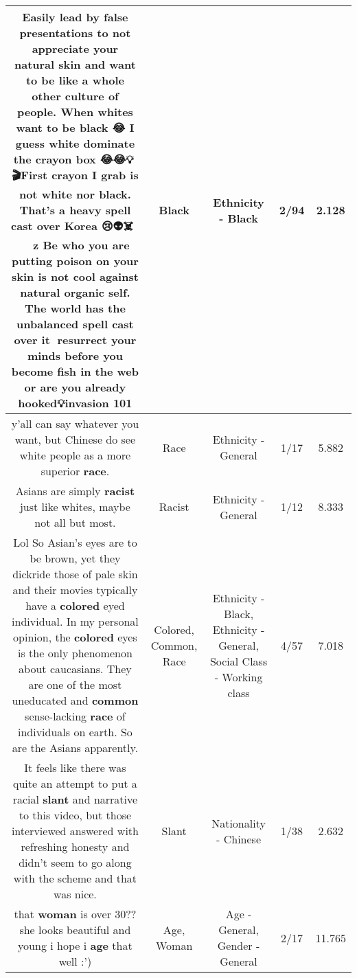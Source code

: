 \documentclass[11pt]{article}
\newlength\mylength
\begin{document}
\begin{center}
\begin{longtable}{|C{.65\mylength}|C{.30\mylength}|C{.12\mylength}|C{.12\mylength}|C{.12\mylength}|}
  \small Easily lead by false presentations to not appreciate your natural skin and want to be like a whole other culture of people. When whites want to be \textbf{black} 😂 I guess white dominate the crayon box 😂😂💡🎥🎬First crayon I grab is not white nor \textbf{black}. That's a heavy spell cast over Korea 😢👽☠️👻🤖🧟‍♀️🧟‍♂️z  Be who you are putting poison on your skin is not cool against natural organic self. The world has the unbalanced spell cast over it🤔 resurrect your minds before you become fish in the web or are you already hooked💡invasion 101\normalsize   & Black & Ethnicity - Black & 2/94 & 2.128 \\  \hline
  \small y'all can say whatever you want, but Chinese do see white people as a more superior \textbf{race}.\normalsize   & Race & Ethnicity - General & 1/17 & 5.882 \\  \hline
  \small Asians are simply \textbf{racist} just like whites, maybe not all but most.\normalsize   & Racist & Ethnicity - General & 1/12 & 8.333 \\  \hline
  \small Lol So Asian's eyes are to be brown, yet they dickride those of pale skin and their movies typically have a \textbf{colored} eyed individual.  In my personal opinion, the \textbf{colored} eyes is the only phenomenon about caucasians.  They are one of the most uneducated and \textbf{common} sense-lacking \textbf{race} of individuals on earth.  So are the Asians apparently.\normalsize   & Colored, Common, Race & Ethnicity - Black, Ethnicity - General, Social Class - Working class & 4/57 & 7.018 \\  \hline
  \small It feels like there was quite an attempt to put a racial \textbf{slant} and narrative to this video,  but those interviewed answered with refreshing honesty and didn't seem to go along with the scheme and that was nice.\normalsize   & Slant & Nationality - Chinese & 1/38 & 2.632 \\  \hline
  \small that \textbf{woman} is over 30?? she looks beautiful and young i hope i \textbf{age} that well :')\normalsize   & Age, Woman & Age - General, Gender - General & 2/17 & 11.765 \\  \hline

\end{longtable}
\end{center}
\end{document}

